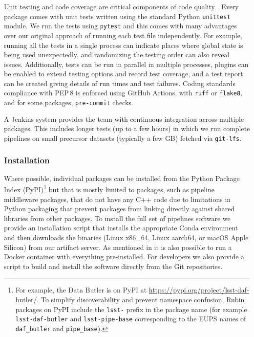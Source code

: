 Unit testing and code coverage are critical components of code quality \citep{2018SPIE10707E..09J}.
Every package comes with unit tests written using the standard Python \texttt{unittest} module.
We run the tests using \texttt{pytest} \citep{pytest} and this comes with many advantages over our original approach of running each test file independently.
For example, running all the tests in a single process can indicate places where global state is being used unexpectedly, and randomizing the testing order can also reveal issues.
Additionally, tests can be run in parallel in multiple processes, plugins can be enabled to extend testing options and record test coverage, and a test report can be created giving details of run times and test failures.
Coding standards compliance with PEP\,8 \citep{pep8} is enforced using GitHub Actions, with \texttt{ruff} or \texttt{flake8}, and for some packages, \texttt{pre-commit} checks.

A Jenkins system \citep{2018SPIE10707E..09J,DMTN-327} provides the team with continuous integration across multiple packages.
This includes longer tests (up to a few hours) in which we run complete pipelines on small precursor datasets (typically a few GB) fetched via \texttt{git-lfs}.

\subsubsection{Installation}

Where possible, individual packages can be installed from the Python Package Index (PyPI)\footnote{For example, the Data Butler is on PyPI at \url{https://pypi.org/project/lsst-daf-butler/}. To simplify discoverability and prevent namespace confusion, Rubin packages on PyPI include the \texttt{lsst-} prefix in the package name (for example \texttt{lsst-daf-butler} and \texttt{lsst-pipe-base} corresponding to the EUPS names of \texttt{daf\_butler} and \texttt{pipe\_base}).} but that is mostly limited to packages, such as pipeline middleware packages, that do not have any C++ code due to limitations in Python packaging that prevent packages from linking directly against shared libraries from other packages.
To install the full set of pipelines software we provide an installation script that installs the appropriate Conda environment and then downloads the binaries (Linux x86\_64, Linux aarch64, or macOS Apple Silicon) from our artifact server.
As mentioned in  it is also possible to run a Docker container with everything pre-installed.
For developers we also provide a script to build and install the software directly from the Git repositories.
